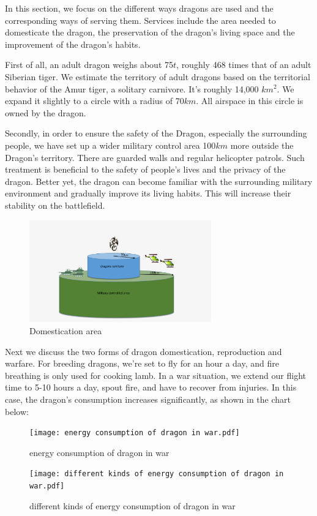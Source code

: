 \documentclass[12pt]{article}  %
\begin{document}
In this section, we focus on the different ways dragons are used and the corresponding ways of serving them. Services include the area needed to domesticate the dragon, the preservation of the dragon's living space and the improvement of the dragon's habits.

First of all, an adult dragon weighs about 75$t$, roughly 468 times that of an adult Siberian tiger. We estimate the territory of adult dragons based on the territorial behavior of the Amur tiger, a solitary carnivore. It's roughly 14,000 $km^{2}$. We expand it slightly to a circle with a radius of 70$km$. All airspace in this circle is owned by the dragon.

Secondly, in order to ensure the safety of the Dragon, especially the surrounding people, we have set up a wider military control area 100$km$ more outside the Dragon's territory. There are guarded walls and regular helicopter patrols. Such treatment is beneficial to the safety of people's lives and the privacy of the dragon. Better yet, the dragon can become familiar with the surrounding military environment and gradually improve its living habits. This will increase their stability on the battlefield.
\vspace{-0.3cm}
\begin{figure}[htbp]
	\centering
	\includegraphics[width=0.7\textwidth]{easymcm/img/Domestication_area.pdf}
	\caption{Domestication area}\label{fig:work1}
\end{figure}

Next we discuss the two forms of dragon domestication, reproduction and warfare. For breeding dragons, we're set to fly for an hour a day, and fire breathing is only used for cooking lamb. In a war situation, we extend our flight time to 5-10 hours a day, spout fire, and have to recover from injuries. In this case, the dragon's consumption increases significantly, as shown in the chart below:

\begin{figure}[h]
	\centering
	\begin{minipage}[t]{0.45\textwidth}
		\centering
		\texttt{[image: energy consumption of dragon in war.pdf]}
		\caption{energy consumption of dragon in war}\label{fig:quanju}
	\end{minipage}
	\begin{minipage}[t]{0.45\textwidth}
		\centering
		\texttt{[image: different kinds of energy consumption of dragon in war.pdf]}
		\caption{different kinds of energy consumption of dragon in war}\label{fig:jubu}
	\end{minipage}
\end{figure}
\end{document}
